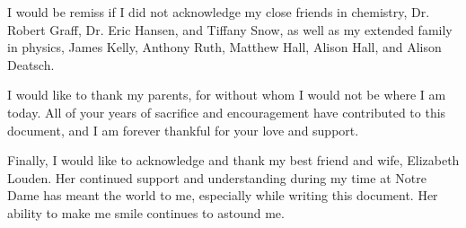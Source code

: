 \documentclass[noinfo,final,sort&compress]{nddiss2e}
\begin{document}
\begin{acknowledge}
  I would be remiss if I did not acknowledge my close friends in
  chemistry, Dr. Robert Graff, Dr. Eric Hansen, and Tiffany Snow, as
  well as my extended family in physics, James Kelly, Anthony Ruth,
  Matthew Hall, Alison Hall, and Alison Deatsch. 

  I would like to thank my parents, for without whom I would not be
  where I am today. All of your years of sacrifice and encouragement
  have contributed to this document, and I am forever thankful for
  your love and support.

  Finally, I would like to acknowledge and thank my best friend and
  wife, Elizabeth Louden. Her continued support and understanding
  during my time at Notre Dame has meant the world to me, especially
  while writing this document. Her ability to make me smile continues
  to astound me.

\end{acknowledge}

\mainmatter










\end{document}
